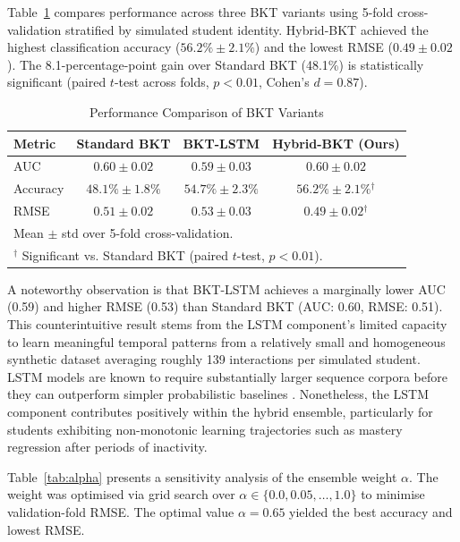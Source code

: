 \documentclass[conference]{IEEEtran}
\begin{document}
Table~\ref{tab:bkt} compares performance across three BKT variants using 5-fold cross-validation stratified by simulated student identity. Hybrid-BKT achieved the highest classification accuracy ($56.2\% \pm 2.1\%$) and the lowest RMSE ($0.49 \pm 0.02$). The 8.1-percentage-point gain over Standard BKT (48.1\%) is statistically significant (paired $t$-test across folds, $p < 0.01$, Cohen's $d = 0.87$).

\begin{table}[htbp]
\caption{Performance Comparison of BKT Variants}
\begin{center}
\begin{tabular}{|l|c|c|c|}
\hline
\textbf{Metric} & \textbf{Standard BKT} & \textbf{BKT-LSTM} & \textbf{Hybrid-BKT (Ours)} \\
\hline
AUC & $0.60 \pm 0.02$ & $0.59 \pm 0.03$ & $0.60 \pm 0.02$ \\
\hline
Accuracy & $48.1\% \pm 1.8\%$ & $54.7\% \pm 2.3\%$ & $\mathbf{56.2\% \pm 2.1\%}$$^\dagger$ \\
\hline
RMSE & $0.51 \pm 0.02$ & $0.53 \pm 0.03$ & $\mathbf{0.49 \pm 0.02}$$^\dagger$ \\
\hline
\multicolumn{4}{l}{\footnotesize Mean $\pm$ std over 5-fold cross-validation.} \\
\multicolumn{4}{l}{\footnotesize $^\dagger$ Significant vs. Standard BKT (paired $t$-test, $p < 0.01$).} \\
\end{tabular}
\label{tab:bkt}
\end{center}
\end{table}

A noteworthy observation is that BKT-LSTM achieves a marginally lower AUC (0.59) and higher RMSE (0.53) than Standard BKT (AUC: 0.60, RMSE: 0.51). This counterintuitive result stems from the LSTM component's limited capacity to learn meaningful temporal patterns from a relatively small and homogeneous synthetic dataset averaging roughly 139 interactions per simulated student. LSTM models are known to require substantially larger sequence corpora before they can outperform simpler probabilistic baselines \cite{b17}. Nonetheless, the LSTM component contributes positively within the hybrid ensemble, particularly for students exhibiting non-monotonic learning trajectories such as mastery regression after periods of inactivity.

Table~\ref{tab:alpha} presents a sensitivity analysis of the ensemble weight $\alpha$. The weight was optimised via grid search over $\alpha \in \{0.0, 0.05, \ldots, 1.0\}$ to minimise validation-fold RMSE. The optimal value $\alpha = 0.65$ yielded the best accuracy and lowest RMSE.
\end{document}
